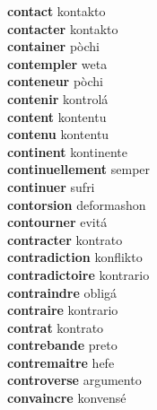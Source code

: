 \textbf{contact } kontakto \\
\textbf{contacter } kontakto \\
\textbf{container } pòchi \\
\textbf{contempler } weta \\
\textbf{conteneur } pòchi \\
\textbf{contenir } kontrolá \\
\textbf{content } kontentu \\
\textbf{contenu } kontentu \\
\textbf{continent } kontinente \\
\textbf{continuellement } semper \\
\textbf{continuer } sufri \\
\textbf{contorsion } deformashon \\
\textbf{contourner } evitá \\
\textbf{contracter } kontrato \\
\textbf{contradiction } konflikto \\
\textbf{contradictoire } kontrario \\
\textbf{contraindre } obligá \\
\textbf{contraire } kontrario \\
\textbf{contrat } kontrato \\
\textbf{contrebande } preto \\
\textbf{contremaitre } hefe \\
\textbf{controverse } argumento \\
\textbf{convaincre } konvensé \\
